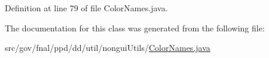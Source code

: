 Definition at line 79 of file Color\-Names.\-java.



The documentation for this class was generated from the following file\-:\begin{DoxyCompactItemize}
\item 
src/gov/fnal/ppd/dd/util/nongui\-Utils/\hyperlink{ColorNames_8java}{Color\-Names.\-java}\end{DoxyCompactItemize}
